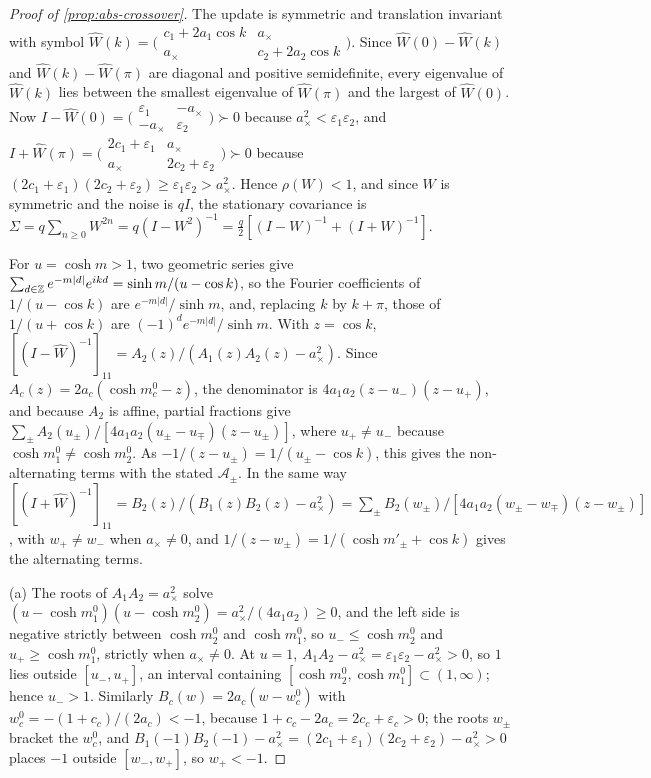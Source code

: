 \begin{proof}[Proof of \cref{prop:abs-crossover}]
The update is symmetric and translation invariant with symbol $\hat W(k)=\bigl(\begin{smallmatrix}c_1+2a_1\cos k&a_\times\\a_\times&c_2+2a_2\cos k\end{smallmatrix}\bigr)$. Since $\hat W(0)-\hat W(k)$ and $\hat W(k)-\hat W(\pi)$ are diagonal and positive semidefinite, every eigenvalue of $\hat W(k)$ lies between the smallest eigenvalue of $\hat W(\pi)$ and the largest of $\hat W(0)$. Now $I-\hat W(0)=\bigl(\begin{smallmatrix}\varepsilon_1&-a_\times\\-a_\times&\varepsilon_2\end{smallmatrix}\bigr)\succ0$ because $a_\times^2<\varepsilon_1\varepsilon_2$, and $I+\hat W(\pi)=\bigl(\begin{smallmatrix}2c_1+\varepsilon_1&a_\times\\a_\times&2c_2+\varepsilon_2\end{smallmatrix}\bigr)\succ0$ because $(2c_1+\varepsilon_1)(2c_2+\varepsilon_2)\ge\varepsilon_1\varepsilon_2>a_\times^2$. Hence $\rho(W)<1$, and since $W$ is symmetric and the noise is $qI$, the stationary covariance is $\Sigma=q\sum_{n\ge0}W^{2n}=q(I-W^2)^{-1}=\frac q2[(I-W)^{-1}+(I+W)^{-1}]$.

For $u=\cosh m>1$, two geometric series give $\sum_{d\in\mathbb{Z}}e^{-m\lvert d\rvert}e^{ikd}=\sinh m/(u-\cos k)$, so the Fourier coefficients of $1/(u-\cos k)$ are $e^{-m\lvert d\rvert}/\sinh m$, and, replacing $k$ by $k+\pi$, those of $1/(u+\cos k)$ are $(-1)^de^{-m\lvert d\rvert}/\sinh m$. With $z=\cos k$, $[(I-\hat W)^{-1}]_{11}=A_2(z)/(A_1(z)A_2(z)-a_\times^2)$. Since $A_c(z)=2a_c(\cosh m^0_c-z)$, the denominator is $4a_1a_2(z-u_-)(z-u_+)$, and because $A_2$ is affine, partial fractions give $\sum_\pm A_2(u_\pm)/[4a_1a_2(u_\pm-u_\mp)(z-u_\pm)]$, where $u_+\ne u_-$ because $\cosh m^0_1\ne\cosh m^0_2$. As $-1/(z-u_\pm)=1/(u_\pm-\cos k)$, this gives the non-alternating terms with the stated $\mathcal A_\pm$. In the same way $[(I+\hat W)^{-1}]_{11}=B_2(z)/(B_1(z)B_2(z)-a_\times^2)=\sum_\pm B_2(w_\pm)/[4a_1a_2(w_\pm-w_\mp)(z-w_\pm)]$, with $w_+\ne w_-$ when $a_\times\ne0$, and $1/(z-w_\pm)=1/(\cosh m'_\pm+\cos k)$ gives the alternating terms.

(a) The roots of $A_1A_2=a_\times^2$ solve $(u-\cosh m^0_1)(u-\cosh m^0_2)=a_\times^2/(4a_1a_2)\ge0$, and the left side is negative strictly between $\cosh m^0_2$ and $\cosh m^0_1$, so $u_-\le\cosh m^0_2$ and $u_+\ge\cosh m^0_1$, strictly when $a_\times\ne0$. At $u=1$, $A_1A_2-a_\times^2=\varepsilon_1\varepsilon_2-a_\times^2>0$, so $1$ lies outside $[u_-,u_+]$, an interval containing $[\cosh m^0_2,\cosh m^0_1]\subset(1,\infty)$; hence $u_->1$. Similarly $B_c(w)=2a_c(w-w^0_c)$ with $w^0_c=-(1+c_c)/(2a_c)<-1$, because $1+c_c-2a_c=2c_c+\varepsilon_c>0$; the roots $w_\pm$ bracket the $w^0_c$, and $B_1(-1)B_2(-1)-a_\times^2=(2c_1+\varepsilon_1)(2c_2+\varepsilon_2)-a_\times^2>0$ places $-1$ outside $[w_-,w_+]$, so $w_+<-1$.


\end{proof}
